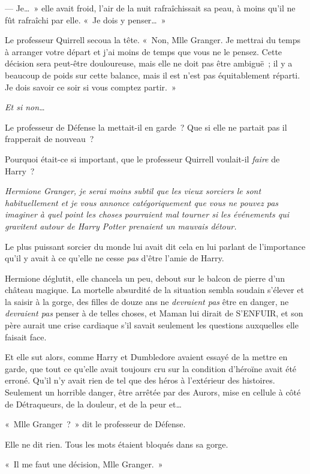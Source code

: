 --- Je…~» elle avait froid, l'air de la nuit rafraîchissait sa peau, à moins qu'il ne fût rafraîchi par elle.
«~Je dois y penser…~»

Le professeur Quirrell secoua la tête.
«~Non, Mlle Granger.
Je mettrai du temps à arranger votre départ et j'ai moins de temps que vous ne le pensez.
Cette décision sera peut-être douloureuse, mais elle ne doit pas être ambiguë~; il y a beaucoup de poids sur cette balance, mais il est n'est pas équitablement réparti.
Je dois savoir ce soir si vous comptez partir.~»

\emph{Et si non…}

Le professeur de Défense la mettait-il en garde~?
Que si elle ne partait pas il frapperait de nouveau~?

Pourquoi était-ce si important, que le professeur Quirrell voulait-il \emph{faire} de Harry~?

\emph{Hermione Granger, je serai moins subtil que les vieux sorciers le sont habituellement et je vous annonce catégoriquement que vous ne pouvez pas imaginer à quel point les choses pourraient mal tourner si les événements qui gravitent autour de Harry Potter prenaient un mauvais détour.}

Le plus puissant sorcier du monde lui avait dit cela en lui parlant de l'importance qu'il y avait à ce qu'elle ne cesse \emph{pas} d'être l'amie de Harry.

Hermione déglutit, elle chancela un peu, debout sur le balcon de pierre d'un château magique.
La mortelle absurdité de la situation sembla soudain s'élever et la saisir à la gorge, des filles de douze ans ne \emph{devraient pas} être en danger, ne \emph{devraient pas} penser à de telles choses, et Maman lui dirait de S'ENFUIR, et son père aurait une crise cardiaque s'il savait seulement les questions auxquelles elle faisait face.

Et elle sut alors, comme Harry et Dumbledore avaient essayé de la mettre en garde, que tout ce qu'elle avait toujours cru sur la condition d'héroïne avait été erroné.
Qu'il n'y avait rien de tel que des héros à l'extérieur des histoires.
Seulement un horrible danger, être arrêtée par des Aurors, mise en cellule à côté de Détraqueurs, de la douleur, et de la peur et…

«~Mlle Granger~?~»
dit le professeur de Défense.

Elle ne dit rien.
Tous les mots étaient bloqués dans sa gorge.

«~Il me faut une décision, Mlle Granger.~»

